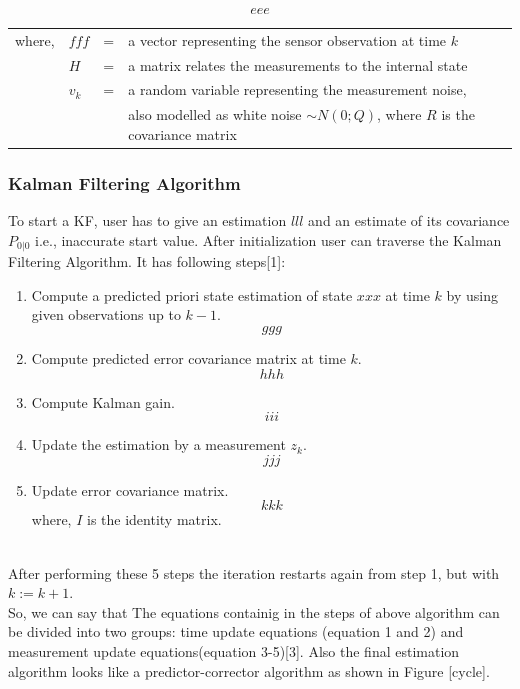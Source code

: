 $$eee$$
\begin{table}[!htbp]
\centering
\label{my-label}
\begin{tabular}{llll}
where, & $fff$     & = & a vector representing the sensor observation at time $k$                                                                                                                                         \\
       & $H$       & = & a matrix relates the measurements to the internal state                                                                                                                                            \\
       & $v_{k}$ & = & a random variable representing the measurement noise, \\
       &        & & also modelled as white noise $\sim N(0; Q)$, where $R$ is the covariance matrix
\end{tabular}
\end{table}

\subsubsection{Kalman Filtering Algorithm}
To start a KF, user has to give an estimation $lll$ and an estimate of its covariance $P_{0|0}$ i.e., inaccurate start value. After initialization user can traverse the Kalman Filtering Algorithm. It has following steps[1]:
\begin{enumerate}
  \item  Compute a predicted priori state estimation of state $xxx$ at time $k$ by using given observations up to $k-1$.
  $$ggg$$
  \item Compute predicted error covariance matrix at time $k$.
  $$hhh$$
  \item Compute Kalman gain.
  $$iii$$
  \item Update the estimation by a measurement $z_{k}$.
  $$jjj$$
  \item Update error covariance matrix.
  $$kkk$$
  where, $I$ is the identity matrix.
\end{enumerate}\\

After performing these 5 steps the iteration restarts again from step 1, but with $k:=k+1$.\\
So, we can say that The equations containig in the steps of above algorithm can be divided into two groups: time update equations (equation 1 and 2) and measurement update equations(equation 3-5)[3]. Also the final estimation algorithm looks like  a predictor-corrector algorithm as shown in Figure [cycle].

